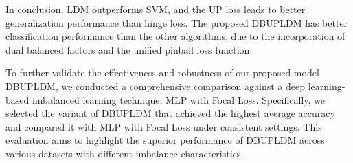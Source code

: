 \documentclass[a4paper]{cas-sc}
\begin{document}
In conclusion, LDM outperforms SVM, and the UP loss leads to better generalization performance than hinge loss. The proposed DBUPLDM has better classification performance than the other algorithms, due to the incorporation of dual balanced factors and the unified pinball loss function.




{\color{blue}To further validate the effectiveness and robustness of our proposed model DBUPLDM, we conducted a comprehensive comparison against a deep learning-based imbalanced learning technique: MLP with Focal Loss\citep{lin2017focal}. Specifically, we selected the variant of DBUPLDM that achieved the highest average accuracy and compared it with MLP with Focal Loss under consistent settings. This evaluation aims to highlight the superior performance of DBUPLDM across various datasets with different imbalance characteristics.}
\end{document}
